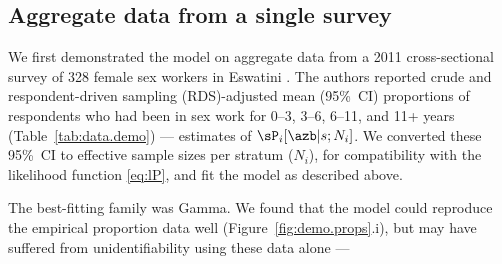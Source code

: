 \subsection{Aggregate data from a single survey}
We first demonstrated the model on aggregate data from
a 2011 cross-sectional survey of 328 female sex workers in Eswatini \cite{Baral2014}.
The authors reported crude and respondent-driven sampling (RDS)-adjusted
mean (95\%~CI) proportions of respondents who had been in sex work for
0--3, 3--6, 6--11, and 11+ years (Table~\ref{tab:data.demo})
--- \ie estimates of $\sP_i[\azb|s;N_i]$.
We converted these 95\%~CI to effective sample sizes per stratum ($N_i$),
for compatibility with the likelihood function \eqref{eq:lP},
and fit the model as described above.
\begin{table}[b]
  \centering
  \caption{RDS-adjusted proportions of durations in sex work
    reported by a 2011 sample of female sex workers in Eswatini
    (N = 313) \cite{Baral2014}}
  \label{tab:data.demo}
  
\end{table}
\par
The best-fitting family was Gamma.
We found that the model could reproduce the empirical proportion data well
(Figure~\ref{fig:demo.props}.i),
but may have suffered from unidentifiability using these data alone --- \ie

